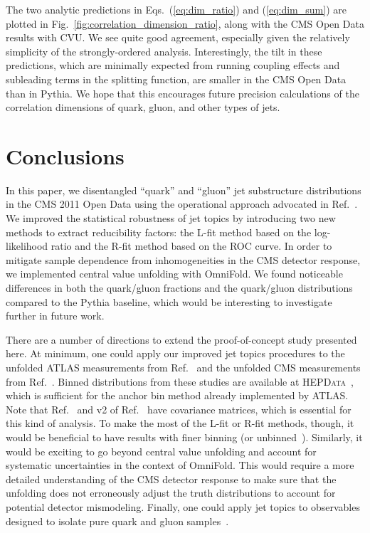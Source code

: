 \documentclass[aps,prd,twocolumn,preprintnumbers,nofootinbib,longbibliography,floatfix]{revtex4-1}
\DeclareRobustCommand{\Fig}[1]{Fig.~\ref{#1}}
\DeclareRobustCommand{\Eqs}[2]{Eqs.~(\ref{#1}) and (\ref{#2})}
\DeclareRobustCommand{\Ref}[1]{Ref.~\cite{#1}}
\newcommand{\Pythia}{{\sc Pythia}\xspace}
\newcommand{\OmniFold}{{\sc OmniFold}\xspace}
\begin{document}
The two analytic predictions in \Eqs{eq:dim_ratio}{eq:dim_sum} are plotted in \Fig{fig:correlation_dimension_ratio}, along with the CMS Open Data results with CVU.
%
We see quite good agreement, especially given the relatively simplicity of the strongly-ordered analysis.
%
Interestingly, the tilt in these predictions, which are minimally expected from running coupling effects and subleading terms in the splitting function, are smaller in the CMS Open Data than in \Pythia.
%
We hope that this encourages future precision calculations of the correlation dimensions of quark, gluon, and other types of jets.


\section{Conclusions}
\label{sec:conc}

In this paper, we disentangled ``quark'' and ``gluon'' jet substructure distributions in the CMS 2011 Open Data using the operational approach advocated in \Ref{Komiske:2018vkc}.
%
We improved the statistical robustness of jet topics by introducing two new methods to extract reducibility factors:  the L-fit method based on the log-likelihood ratio and the R-fit method based on the ROC curve.
%
In order to mitigate sample dependence from inhomogeneities in the CMS detector response, we implemented central value unfolding with \OmniFold.
%
We found noticeable differences in both the quark/gluon fractions and the quark/gluon distributions compared to the \Pythia baseline, which would be interesting to investigate further in future work.


There are a number of directions to extend the proof-of-concept study presented here.
%
At minimum, one could apply our improved jet topics procedures to the unfolded ATLAS measurements from \Ref{ATLAS:2019rqw} and the unfolded CMS measurements from \Ref{CMS:2021iwu}.
%
Binned distributions from these studies are available at \textsc{HEPData}~\cite{hepdata.89321,hepdata.111308}, which is sufficient for the anchor bin method already implemented by ATLAS.
%
Note that \Ref{hepdata.111308} and v2 of \Ref{hepdata.89321} have covariance matrices, which is essential for this kind of analysis.
%
To make the most of the L-fit or R-fit methods, though, it would be beneficial to have results with finer binning (or unbinned~\cite{Arratia:2021otl}).
%
Similarly, it would be exciting to go beyond central value unfolding and account for systematic uncertainties in the context of \OmniFold.
%
This would require a more detailed understanding of the CMS detector response to make sure that the unfolding does not erroneously adjust the truth distributions to account for potential detector mismodeling.
%
Finally, one could apply jet topics to observables designed to isolate pure quark and gluon samples~\cite{Stewart:2022ari}.
\end{document}
